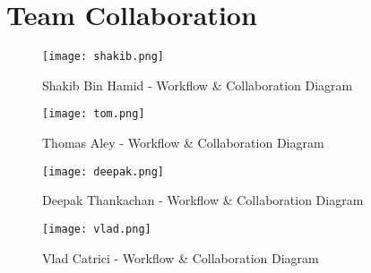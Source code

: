\chapter{Team Collaboration}
\label{appendix:team-collaboration}

\begin{figure}[!hbt]
  	\centering
 	\texttt{[image: shakib.png]}
  	\caption{Shakib Bin Hamid - Workflow \& Collaboration Diagram}
 	\label{fig:shakib-collaboration}
\end{figure}

\begin{figure}[!hbt]
  	\centering
 	\texttt{[image: tom.png]}
  	\caption{Thomas Aley - Workflow \& Collaboration Diagram}
 	\label{fig:tom-collaboration}
\end{figure}

\begin{figure}[!hbt]
  	\centering
 	\texttt{[image: deepak.png]}
  	\caption{Deepak Thankachan - Workflow \& Collaboration Diagram}
 	\label{fig:deepak-collaboration}
\end{figure}

\begin{figure}[!hbt]
  	\centering
 	\texttt{[image: vlad.png]}
  	\caption{Vlad Catrici - Workflow \& Collaboration Diagram}
 	\label{fig:vlad-collaboration}
\end{figure}

